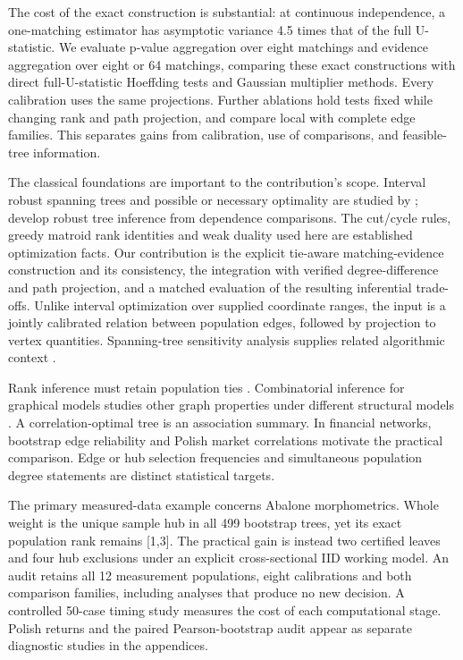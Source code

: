 \documentclass[11pt]{article}
\theoremstyle{plain}
\theoremstyle{definition}\newtheorem{remark}{Remark}\newtheorem{example}{Example}
\begin{document}
The cost of the exact construction is substantial: at continuous independence, a one-matching estimator has asymptotic variance 4.5 times that of the full U-statistic. We evaluate p-value aggregation over eight matchings and evidence aggregation over eight or 64 matchings, comparing these exact constructions with direct full-U-statistic Hoeffding tests and Gaussian multiplier methods. Every calibration uses the same projections. Further ablations hold tests fixed while changing rank and path projection, and compare local with complete edge families. This separates gains from calibration, use of comparisons, and feasible-tree information.

The classical foundations are important to the contribution's scope. Interval robust spanning trees and possible or necessary optimality are studied by \citet{yaman2001,kasperski2007,fortin2007}; \citet{zaffalon2005} develop robust tree inference from dependence comparisons. The cut/cycle rules, greedy matroid rank identities and weak duality used here are established optimization facts. Our contribution is the explicit tie-aware matching-evidence construction and its consistency, the integration with verified degree-difference and path projection, and a matched evaluation of the resulting inferential trade-offs. Unlike interval optimization over supplied coordinate ranges, the input is a jointly calibrated relation between population edges, followed by projection to vertex quantities. Spanning-tree sensitivity analysis supplies related algorithmic context \citep{pettie2014}.

Rank inference must retain population ties \citep{hall2009,mogstad2024}. Combinatorial inference for graphical models studies other graph properties under different structural models \citep{neykov2019}. A correlation-optimal tree is an association summary. In financial networks, bootstrap edge reliability \citep{tumminello2007,musciotto2018} and Polish market correlations \citep{galazka2011} motivate the practical comparison. Edge or hub selection frequencies and simultaneous population degree statements are distinct statistical targets.

The primary measured-data example concerns Abalone morphometrics. Whole weight is the unique sample hub in all 499 bootstrap trees, yet its exact population rank remains [1,3]. The practical gain is instead two certified leaves and four hub exclusions under an explicit cross-sectional IID working model. An audit retains all 12 measurement populations, eight calibrations and both comparison families, including analyses that produce no new decision. A controlled 50-case timing study measures the cost of each computational stage. Polish returns and the paired Pearson-bootstrap audit appear as separate diagnostic studies in the appendices.
\end{document}

